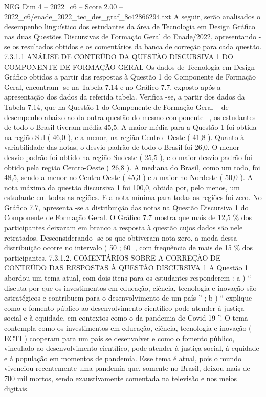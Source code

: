 \begin{textsample}{NEG Dim 4 – 2022\_c6 – Score 2.00 – 2022\_c6/enade\_2022\_tec\_des\_graf\_8c42866294.txt}
A seguir, serão analisados o desempenho linguístico dos estudantes da área de Tecnologia em Design Gráfico nas duas Questões Discursivas de Formação Geral do Enade/2022, apresentando -se os resultados obtidos e os comentários da banca de correção para cada questão. 7.3.1.1 ANÁLISE DE CONTEÚDO DA QUESTÃO DISCURSIVA 1 DO COMPONENTE DE FORMAÇÃO GERAL Os dados de Tecnologia em Design Gráfico obtidos a partir das respostas à Questão 1 do Componente de Formação Geral, encontram -se na Tabela 7.14 e no Gráfico 7.7, exposto após a apresentação dos dados da referida tabela.
Verifica -se, a partir dos dados da Tabela 7.14, que na Questão 1 do Componente de Formação Geral – de desempenho abaixo ao da outra questão do mesmo componente –, os estudantes de todo o Brasil tiveram média 45,5.
A maior média para a Questão 1 foi obtida na região Sul ( 46,0 ), e a menor, na região Centro- Oeste ( 41,8 ).
Quanto à variabilidade das notas, o desvio-padrão de todo o Brasil foi 26,0.
O menor desvio-padrão foi obtido na região Sudeste ( 25,5 ), e o maior desvio-padrão foi obtido pela região Centro-Oeste ( 26,8 ).
A mediana do Brasil, como um todo, foi 48,5, sendo a menor no Centro-Oeste ( 45,3 ) e a maior no Nordeste ( 50,0 ).
A nota máxima da questão discursiva 1 foi 100,0, obtida por, pelo menos, um estudante em todas as regiões.
E a nota mínima para todas as regiões foi zero.
No Gráfico 7.7, apresenta -se a distribuição das notas na Questão Discursiva 1 do Componente de Formação Geral.
O Gráfico 7.7 mostra que mais de 12,5 \% dos participantes deixaram em branco a resposta à questão cujos dados são nele retratados.
Desconsiderando -se os que obtiveram nota zero, a moda dessa distribuição ocorre no intervalo ( 50 ; 60 ], com frequência de mais de 15 \% dos participantes. 7.3.1.2.
COMENTÁRIOS SOBRE A CORREÇÃO DE CONTEÚDO DAS RESPOSTAS À QUESTÃO DISCURSIVA 1 A Questão 1 abordou um tema atual, com dois itens para os estudantes responderem : a ) “ discuta por que os investimentos em educação, ciência, tecnologia e inovação são estratégicos e contribuem para o desenvolvimento de um país ” ; b ) “ explique como o fomento público ao desenvolvimento científico pode atender à justiça social e à equidade, em contextos como o da pandemia de Covid-19 ”.
O tema contempla como os investimentos em educação, ciência, tecnologia e inovação ( ECTI ) cooperam para um país se desenvolver e como o fomento público, vinculado ao desenvolvimento científico, pode atender à justiça social, à equidade e à população em momentos de pandemia.
Esse tema é atual, pois o mundo vivenciou recentemente uma pandemia que, somente no Brasil, deixou mais de 700 mil mortos, sendo exaustivamente comentada na televisão e nos meios digitais.

\end{textsample}
